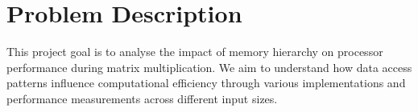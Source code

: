 \section{Problem Description}
\label{sec:problemDescription}
This project goal is to analyse the impact of memory hierarchy on 
processor performance during matrix multiplication. We aim to 
understand how data access patterns influence computational 
efficiency through various implementations and performance 
measurements across different input sizes.